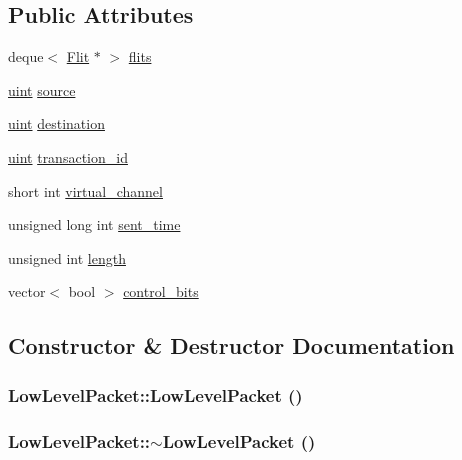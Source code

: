 \subsection*{Public Attributes}
\begin{CompactItemize}
\item 
deque$<$ \hyperlink{classFlit}{Flit} $\ast$ $>$ \hyperlink{classLowLevelPacket_eee86f15c92fad6be8b7e6bc4df223e3}{flits}
\item 
\hyperlink{outputBuffer_8h_91ad9478d81a7aaf2593e8d9c3d06a14}{uint} \hyperlink{classLowLevelPacket_c7aee6df6db0e4bb8e5be36b061a95bc}{source}
\item 
\hyperlink{outputBuffer_8h_91ad9478d81a7aaf2593e8d9c3d06a14}{uint} \hyperlink{classLowLevelPacket_225808b46aefe4d252c040e91c9411b0}{destination}
\item 
\hyperlink{outputBuffer_8h_91ad9478d81a7aaf2593e8d9c3d06a14}{uint} \hyperlink{classLowLevelPacket_ed8dd9d70bac87be59a61fe8ac4b399d}{transaction\_\-id}
\item 
short int \hyperlink{classLowLevelPacket_3fa4ac5563bbf3005a809c0b193f4c84}{virtual\_\-channel}
\item 
unsigned long int \hyperlink{classLowLevelPacket_8a51892863d89c8b8b28f75c19fa0199}{sent\_\-time}
\item 
unsigned int \hyperlink{classLowLevelPacket_69297a63b62cdce301d004782cc3ef3c}{length}
\item 
vector$<$ bool $>$ \hyperlink{classLowLevelPacket_7537b9b0339e77d3d4a2d04998e1a950}{control\_\-bits}
\end{CompactItemize}


\subsection{Constructor \& Destructor Documentation}
\hypertarget{classLowLevelPacket_550561f33ccae00163b40e963121c156}{
\subsubsection[{LowLevelPacket}]{\setlength{\rightskip}{0pt plus 5cm}LowLevelPacket::LowLevelPacket ()}}
\label{classLowLevelPacket_550561f33ccae00163b40e963121c156}


\hypertarget{classLowLevelPacket_52d6041c394872c42cd4211e09ca76d4}{
\subsubsection[{$\sim$LowLevelPacket}]{\setlength{\rightskip}{0pt plus 5cm}LowLevelPacket::$\sim$LowLevelPacket ()}}
\label{classLowLevelPacket_52d6041c394872c42cd4211e09ca76d4}




